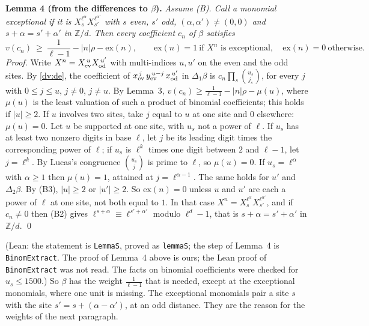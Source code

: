 \documentclass[11pt,letterpaper]{article}
\newcommand{\Z}{\mathbb Z}\newcommand{\Q}{\mathbb Q}\newcommand{\C}{\mathbb C}
\begin{document}
\textbf{Lemma 4 (from the differences to $\beta$).} \emph{Assume \textup{(B)}. Call a monomial
\emph{exceptional} if it is $X_s^{\ell^\alpha}X_{s'}^{\ell^{\alpha'}}$ with $s$ even, $s'$ odd,
$(\alpha,\alpha')\ne(0,0)$ and $s+\alpha=s'+\alpha'$ in $\Z/d$. Then every coefficient $c_n$ of $\beta$
satisfies}
\begin{equation}\label{dv:beta}
 v(c_n)\ \ge\ \frac1{\ell-1}-|n|\rho-\mathrm{ex}(n),\qquad \mathrm{ex}(n)=1\ \text{if $X^n$ is exceptional},\quad
 \mathrm{ex}(n)=0\ \text{otherwise.}
\end{equation}
\emph{Proof.} Write $X^n=X_{\rm ev}^{\,u}X_{\rm od}^{\,u'}$ with multi-indices $u,u'$ on the even and the odd
sites. By \eqref{dv:de}, the coefficient of $x_{\rm ev}^{\,j}\,y_{\rm ev}^{\,u-j}\,x_{\rm od}^{\,u'}$ in
$\Delta_1\beta$ is $c_n\prod_s\binom{u_s}{j_s}$, for every $j$ with $0\le j\le u$, $j\ne0$, $j\ne u$. By
Lemma~3, $v(c_n)\ge\frac1{\ell-1}-|n|\rho-\mu(u)$, where $\mu(u)$ is the least valuation of such a product
of binomial coefficients; this holds if $|u|\ge2$. If $u$ involves two sites, take $j$ equal to $u$ at one
site and $0$ elsewhere: $\mu(u)=0$. Let $u$ be supported at one site, with $u_s$ not a power of $\ell$. If $u_s$ has at least two nonzero
digits in base $\ell$, let $j$ be its leading digit times the corresponding power of $\ell$; if
$u_s$ is $\ell^k$ times one digit between $2$ and $\ell-1$, let $j=\ell^k$. By Lucas's congruence $\binom{u_s}{j}$ is prime to
$\ell$, so $\mu(u)=0$. If $u_s=\ell^\alpha$ with $\alpha\ge1$ then $\mu(u)=1$, attained at $j=\ell^{\alpha-1}$. The same
holds for $u'$ and $\Delta_2\beta$. By (B3), $|u|\ge2$ or $|u'|\ge2$. So $\mathrm{ex}(n)=0$ unless $u$ and $u'$
are each a power of $\ell$ at one site, not both equal to $1$. In that case
$X^n=X_s^{\ell^\alpha}X_{s'}^{\ell^{\alpha'}}$, and if $c_n\ne0$ then (B2) gives
$\ell^{s+\alpha}\equiv\ell^{s'+\alpha'}$ modulo $\ell^d-1$, that is $s+\alpha=s'+\alpha'$ in $\Z/d$. \qed

\noindent (Lean: the statement is \texttt{LemmaS}, proved as \texttt{lemmaS}; the step of Lemma~4 is
\texttt{BinomExtract}. The proof of Lemma~4 above is ours; the Lean proof of \texttt{BinomExtract} was not
read. The facts on binomial coefficients were checked for $u_s\le1500$.)
So $\beta$ has the weight $\frac1{\ell-1}$ that is needed, except at the exceptional monomials, where one
unit is missing. The exceptional monomials pair a site $s$ with the site $s'=s+(\alpha-\alpha')$, at an odd
distance. They are the reason for the weights of the next paragraph.
\end{document}
